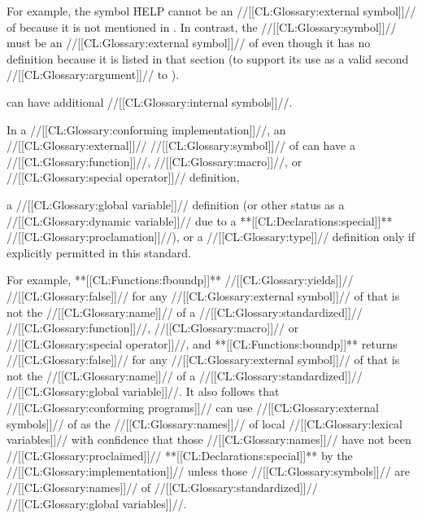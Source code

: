 For example, the symbol \f{HELP} cannot be an //[[CL:Glossary:external symbol]]// of
 because it is not mentioned in \secref\CLsymbols.
In contrast, the //[[CL:Glossary:symbol]]// 
must be an //[[CL:Glossary:external symbol]]// of  
even though it has no definition
because it is listed in that section
(to support its use as a valid second //[[CL:Glossary:argument]]// to ). 


 can have additional //[[CL:Glossary:internal symbols]]//.



In a //[[CL:Glossary:conforming implementation]]//,
an //[[CL:Glossary:external]]// //[[CL:Glossary:symbol]]// of  can have
   a //[[CL:Glossary:function]]//, //[[CL:Glossary:macro]]//, or //[[CL:Glossary:special operator]]// definition, 

   a //[[CL:Glossary:global variable]]// definition
   (or other status as a //[[CL:Glossary:dynamic variable]]// 
    due to a **[[CL:Declarations:special]]** //[[CL:Glossary:proclamation]]//),
or a //[[CL:Glossary:type]]// definition
only if explicitly permitted in this standard.


For example,
  **[[CL:Functions:fboundp]]** //[[CL:Glossary:yields]]// //[[CL:Glossary:false]]// 
  for any //[[CL:Glossary:external symbol]]// of  
  that is not the //[[CL:Glossary:name]]// of a //[[CL:Glossary:standardized]]// 
   //[[CL:Glossary:function]]//, //[[CL:Glossary:macro]]// or //[[CL:Glossary:special operator]]//,
and
  **[[CL:Functions:boundp]]** returns //[[CL:Glossary:false]]// 
  for any //[[CL:Glossary:external symbol]]// of  
  that is not the //[[CL:Glossary:name]]// of a //[[CL:Glossary:standardized]]// //[[CL:Glossary:global variable]]//.
It also follows that
  //[[CL:Glossary:conforming programs]]// can use //[[CL:Glossary:external symbols]]// of  
  as the //[[CL:Glossary:names]]// of local //[[CL:Glossary:lexical variables]]// 
  with confidence that those //[[CL:Glossary:names]]// have not been //[[CL:Glossary:proclaimed]]// **[[CL:Declarations:special]]** 
  by the //[[CL:Glossary:implementation]]//
  unless those //[[CL:Glossary:symbols]]// are
    //[[CL:Glossary:names]]// of //[[CL:Glossary:standardized]]// //[[CL:Glossary:global variables]]//.









